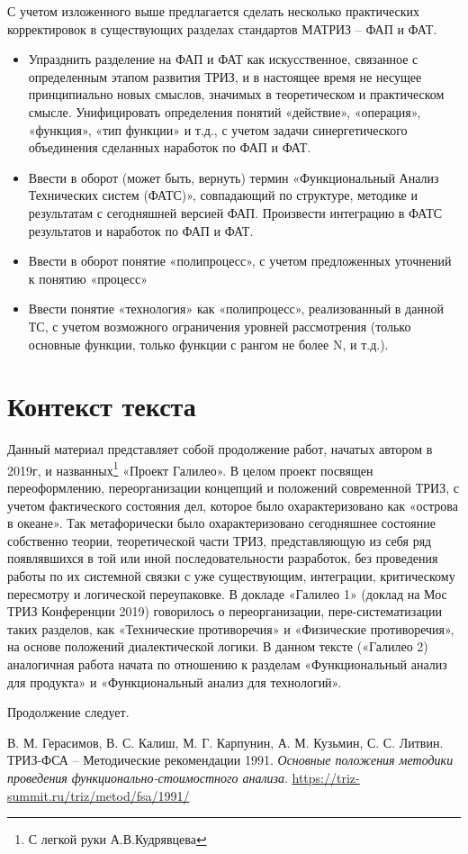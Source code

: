 \documentclass[11pt,a4paper]{article}
\begin{document}
С учетом изложенного выше предлагается сделать несколько практических
корректировок в существующих разделах стандартов МАТРИЗ – ФАП и ФАТ.
\begin{itemize}
\item[1.] Упразднить разделение на ФАП и ФАТ как искусственное, связанное с
  определенным этапом развития ТРИЗ, и в настоящее время не несущее
  принципиально новых смыслов, значимых в теоретическом и практическом смысле.
  Унифицировать определения понятий «действие», «операция», «функция», «тип
  функции» и т.д., с учетом задачи синергетического объединения сделанных
  наработок по ФАП и ФАТ.
\item[2.] Ввести в оборот (может быть, вернуть) термин «Функциональный Анализ
  Технических систем (ФАТС)», совпадающий по структуре, методике и результатам
  с сегодняшней версией ФАП. Произвести интеграцию в ФАТС результатов и
  наработок по ФАП и ФАТ.
\item[3.] Ввести в оборот понятие «полипроцесс», с учетом предложенных
  уточнений к понятию «процесс»
\item[4.] Ввести понятие «технология» как «полипроцесс», реализованный в
  данной ТС, с учетом возможного ограничения уровней рассмотрения (только
  основные функции, только функции с рангом не более N, и т.д.).
\end{itemize}

\section{Контекст текста}

Данный материал представляет собой продолжение работ, начатых автором в 2019г,
и названных\footnote{С легкой руки А.В.Кудрявцева} «Проект Галилео». В целом
проект посвящен переоформлению, переорганизации концепций и положений
современной ТРИЗ, с учетом фактического состояния дел, которое было
охарактеризовано как «острова в океане». Так метафорически было
охарактеризовано сегодняшнее состояние собственно теории, теоретической части
ТРИЗ, представляющую из себя ряд появлявшихся в той или иной
последовательности разработок, без проведения работы по их системной связки с
уже существующим, интеграции, критическому пересмотру и логической
переупаковке. В докладе «Галилео 1» (доклад на Мос ТРИЗ Конференции 2019)
говорилось о переорганизации, пере-систематизации таких разделов, как
«Технические противоречия» и «Физические противоречия», на основе положений
диалектической логики. В данном тексте («Галилео 2) аналогичная работа начата
по отношению к разделам «Функциональный анализ для продукта» и «Функциональный
анализ для технологий».

Продолжение следует.

\begin{thebibliography}{xxx}
 В. М. Герасимов, В. С. Калиш, М. Г. Карпунин,
  А. М. Кузьмин, С. С. Литвин.  ТРИЗ-ФСА -- Методические рекомендации 1991.
  \emph{Основные положения методики проведения функционально-стоимостного
    анализа}.  \url{https://triz-summit.ru/triz/metod/fsa/1991/}
\end{thebibliography}
\end{document}
